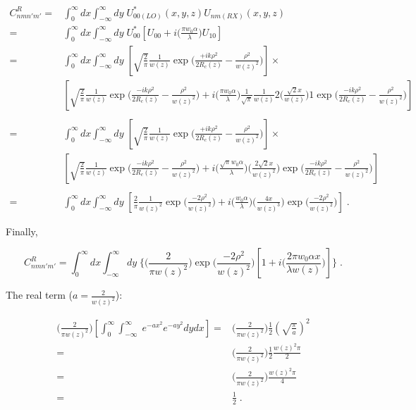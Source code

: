 \documentclass[aps,twoside,secnumarabic,balancelastpage,amsmath,amssymb,nofootinbib,hyperref=pdftex]{revtex4}
\newcommand{\bigfrac}[2]{\Big( \frac{#1}{#2}\Big)}
\begin{document}
\begin{align*}
C_{nmn'm'}^{R} =& \int_{0}^{\infty} dx\int_{-\infty}^{\infty} dy \; U_{00(LO)}^*(x,y,z) U_{nm(RX)}(x,y,z)
\\=&\int_{0}^{\infty}dx\int_{-\infty}^{\infty}  dy \;
 U_{00}^* \left[ U_{00} + i  \bigfrac{\pi w_{0} \alpha}{\lambda}U_{10} \right]
\\=&\int_{0}^{\infty}dx\int_{-\infty}^{\infty}  dy \;
\left[
\sqrt{\frac{2}{\pi}}
		\frac{1}{w(z)}
		\exp \Big(\frac{+ik\rho^2}{2R_{c}(z)}-
		\frac{\rho^2}{w(z)^{2}} \Big) \right]
\times
\\&
\left[
\sqrt{\frac{2}{\pi}}
		\frac{1}{w(z)}
		\exp \Big(\frac{-ik \rho^2}{2R_{c}(z)}-
		\frac{\rho^2}{w(z)^{2}} \Big) 
+
i  \bigfrac{\pi w_{0} \alpha}{\lambda}
\frac{1}{\sqrt{\pi}}
		\frac{1}{w(z)} 
		2 \Big( \frac{\sqrt{2}x}{w(z)} \Big)
		1
		\exp \Big(\frac{-ik \rho^2}{2R_{c}(z)}-
		\frac{\rho^2}{w(z)^{2}} \Big)			
\right]
\\\\=&\int_{0}^{\infty}dx\int_{-\infty}^{\infty} dy \;
\left[
\sqrt{\frac{2}{\pi}}
		\frac{1}{w(z)}
		\exp \Big(\frac{+ik\rho^2}{2R_{c}(z)}-
		\frac{\rho^2}{w(z)^{2}} \Big) \right]
\times
\\&
\left[
\sqrt{\frac{2}{\pi}}
		\frac{1}{w(z)}
		\exp \Big(\frac{-ik \rho^2}{2R_{c}(z)}-
		\frac{\rho^2}{w(z)^{2}} \Big) 
+
i  \bigfrac{\sqrt{\pi} w_{0} \alpha}{\lambda}
		\Big( \frac{2 \sqrt{2}x}{w(z)^2} \Big)
		\exp \Big(\frac{-ik \rho^2}{2R_{c}(z)}-
		\frac{\rho^2}{w(z)^{2}} \Big)			
\right]
\\\\=&\int_{0}^{\infty}dx\int_{-\infty}^{\infty}  dy \;
\left[
\frac{2}{\pi}
		\frac{1}{w(z)^2}
		\exp \bigfrac{-2\rho^2}{w(z)^{2}}
+
i  \bigfrac{ w_{0} \alpha}{\lambda}
		\Big( \frac{4 x}{w(z)^3} \Big)
		\exp \bigfrac{-2 \rho^2}{w(z)^{2}}			
\right] 
\;.
\end{align*}

Finally,

\begin{equation}
C_{nmn'm'}^{R} = \int_{0}^{\infty} dx\int_{-\infty}^{\infty}  dy \;
\lbrace
	\bigfrac{2}{\pi w(z)^2}
	\exp \bigfrac{-2 \rho^2}{w(z)^{2}}	
	\left[
		1 
		+ 
		i  \bigfrac{ 2 \pi w_{0} \alpha x}{\lambda w(z)}		
	\right]
\rbrace
\;.
\end{equation}	

The real term ($a = \frac{2}{w(z)^2}$):

\begin{align*}
\bigfrac{2}{\pi w(z)^2}
\left[
\int_{0}^{\infty} \int_{-\infty}^{\infty}  \; e^{-a x^2} e^{-a y^2} dydx \right]
=&
 \bigfrac{2}{\pi w(z)^2}
 \frac{1}{2} (\sqrt{\frac{\pi}{a} })^2
 \\=& 
 \bigfrac{2}{\pi w(z)^2}\frac{1}{2}{\frac{w(z)^2 \pi}{2} }
 \\=&
 \bigfrac{2}{\pi w(z)^2}\frac{w(z)^2 { \pi}}{4} 
 \\=& \frac{1}{2}
\;.
\end{align*}
\end{document}
